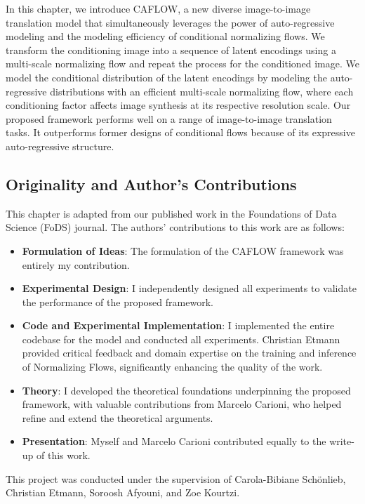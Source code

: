 In this chapter, we introduce CAFLOW, a new diverse image-to-image translation model that simultaneously leverages the power of auto-regressive modeling and the modeling efficiency of conditional normalizing flows. We transform the conditioning image into a sequence of latent encodings using a multi-scale normalizing flow and repeat the process for the conditioned image. We model the conditional distribution of the latent encodings by modeling the auto-regressive distributions with an efficient multi-scale normalizing flow, where each conditioning factor affects image synthesis at its respective resolution scale. Our proposed framework performs well on a range of image-to-image translation tasks. It outperforms former designs of conditional flows because of its expressive auto-regressive structure.


\subsection*{Originality and Author’s Contributions}

This chapter is adapted from our published work \cite{batzolis2024caflow} in the Foundations of Data Science (FoDS) journal. The authors' contributions to this work are as follows:

\begin{itemize}
\item \textbf{Formulation of Ideas}: The formulation of the CAFLOW framework was entirely my contribution.
\item \textbf{Experimental Design}: I independently designed all experiments to validate the performance of the proposed framework.
\item \textbf{Code and Experimental Implementation}: I implemented the entire codebase for the model and conducted all experiments. Christian Etmann provided critical feedback and domain expertise on the training and inference of Normalizing Flows, significantly enhancing the quality of the work.
\item \textbf{Theory}: I developed the theoretical foundations underpinning the proposed framework, with valuable contributions from Marcelo Carioni, who helped refine and extend the theoretical arguments.
\item \textbf{Presentation}: Myself and Marcelo Carioni contributed equally to the write-up of this work.
\end{itemize}

This project was conducted under the supervision of Carola-Bibiane Sch\"onlieb, Christian Etmann, Soroosh Afyouni, and Zoe Kourtzi. 

